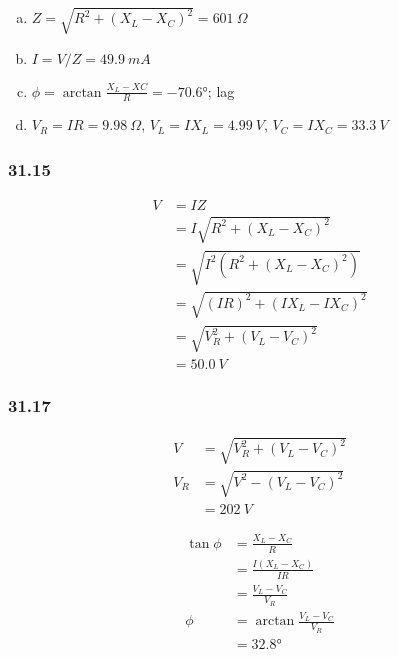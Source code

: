 \documentclass{article}
\begin{document}
\begin{enumerate}[(a)]
  \item $Z = \sqrt{R^2 + (X_L - X_C)^2} = \qty{601}{\Omega}$

  \item $I = V / Z = \qty{49.9}{mA}$

  \item $\phi = \arctan \frac{X_L - XC}{R} = \ang{-70.6}$; lag

  \item $V_R = I R = \qty{9.98}{\Omega}$, $V_L = I X_L = \qty{4.99}{V}$, $V_C = I X_C = \qty{33.3}{V}$
\end{enumerate}

\subsubsection{31.15}

\begin{align*}
  V & = I Z                                \\
    & = I \sqrt{R^2 + (X_L - X_C)^2}       \\
    & = \sqrt{I^2 (R^2 + (X_L - X_C)^2)}   \\
    & = \sqrt{(I R)^2 + (I X_L - I X_C)^2} \\
    & = \sqrt{V_R^2 + (V_L - V_C)^2}       \\
    & = \qty{50.0}{V}
\end{align*}

\subsubsection{31.17}

\begin{align*}
  V   & = \sqrt{V_R^2 + (V_L - V_C)^2} \\
  V_R & = \sqrt{V^2 - (V_L - V_C)^2}   \\
      & = \qty{202}{V}
\end{align*}

\begin{align*}
  \tan \phi & = \frac{X_L - X_C}{R}           \\
            & = \frac{I (X_L - X_C)}{I R}     \\
            & = \frac{V_L - V_C}{V_R}         \\
  \phi      & = \arctan \frac{V_L - V_C}{V_R} \\
            & = \ang{32.8}
\end{align*}
\end{document}
